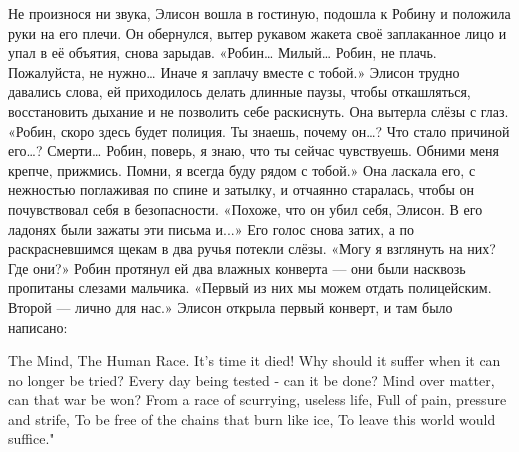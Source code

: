 \documentclass[a4paper,12pt]{book}
\begin{document}
	Не произнося ни звука, Элисон вошла в гостиную, подошла к Робину и положила руки на его плечи.
	Он обернулся, вытер рукавом жакета своё заплаканное лицо и упал в её объятия, снова зарыдав.
	«Робин… Милый… Робин, не плачь. Пожалуйста, не нужно… Иначе я заплачу вместе с тобой.»
	Элисон трудно давались слова, ей приходилось делать длинные паузы, чтобы откашляться, восстановить дыхание и не позволить себе раскиснуть. Она вытерла слёзы с глаз.
	«Робин, скоро здесь будет полиция. Ты знаешь, почему он…? Что стало причиной его…? Смерти… Робин, поверь, я знаю, что ты сейчас чувствуешь. Обними меня крепче, прижмись. Помни, я всегда буду рядом с тобой.»
	Она ласкала его, с нежностью поглаживая по спине и затылку, и отчаянно старалась, чтобы он почувствовал себя в безопасности.
	«Похоже, что он убил себя, Элисон. В его ладонях были зажаты эти письма и...»
	Его голос снова затих, а по раскрасневшимся щекам в два ручья потекли слёзы.
	«Могу я взглянуть на них? Где они?»
	Робин протянул ей два влажных конверта — они были насквозь пропитаны слезами мальчика.
	«Первый из них мы можем отдать полицейским. Второй — лично для нас.»
	Элисон открыла первый конверт, и там было написано:

	The Mind, The Human Race.
	It's time it died!
	Why should it suffer when it can no longer be tried?
	Every day being tested - can it be done?
	Mind over matter, can that war be won?
	From a race of scurrying, useless life,
	Full of pain, pressure and strife,
	To be free of the chains that burn like ice,
	To leave this world would suffice."
\end{document}

